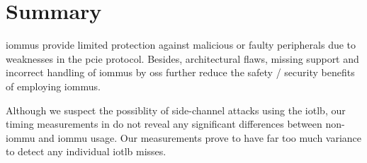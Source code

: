 \section{Summary}
\label{sec:sec_summary}

\acp{iommu} provide limited protection against malicious or faulty peripherals
due to weaknesses in the \ac{pcie} protocol. Besides, architectural flaws,
missing support and incorrect handling of \acp{iommu} by \aclp{os} further
reduce the safety / security benefits of employing \acp{iommu}.

Although we suspect the possiblity of side-channel attacks using the \ac{iotlb},
our timing measurements in  do not reveal any significant
differences between non-\ac{iommu} and \ac{iommu} usage. Our measurements prove
to have far too much variance to detect any individual \ac{iotlb} misses.

